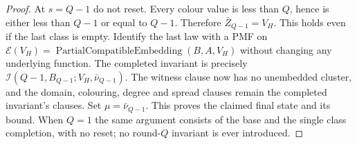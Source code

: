 \begin{proof}
At $s=Q-1$ do not reset. Every colour value is less than $Q$, hence is
either less than $Q-1$ or equal to $Q-1$. Therefore
$\bar Z_{Q-1}=V_H$. This holds even if the last class is empty.
Identify the last law with a PMF on
$\mathcal E(V_H)=\operatorname{PartialCompatibleEmbedding}(B,A,V_H)$
without changing any underlying function. The completed invariant is
precisely $\mathcal I(Q-1,B_{Q-1};V_H,\bar\nu_{Q-1})$.
The witness clause now has no unembedded cluster, and the domain,
colouring, degree and spread clauses remain the completed invariant's
clauses. Set $\mu=\bar\nu_{Q-1}$. This proves the claimed final state
and its  bound. When $Q=1$ the same argument
consists of the base and the single class completion, with no reset;
no round-$Q$ invariant is ever introduced.
\end{proof}
